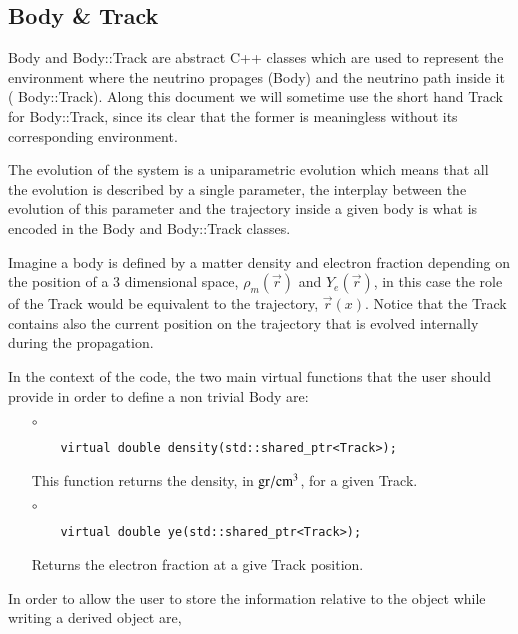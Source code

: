 \subsection{Body \& Track}

{\ttf Body} and {\ttf Body::Track} are abstract {\ttf C++} classes
which are used to represent the environment where the neutrino
propages ({\ttf Body}) and the neutrino path inside it ({\ttf
  Body::Track}). Along this document we will sometime use the short
hand {\ttf Track} for {\ttf Body::Track},
 since its clear that the former is meaningless without its
 corresponding environment.

The evolution of the system is a uniparametric evolution which means
that all the evolution is described by a single parameter, the
interplay between the evolution of this parameter and the trajectory
inside a given body is what is encoded in the {\ttf Body} and 
{\ttf Body::Track} classes.

Imagine a {\ttf body} is defined by a matter density and electron fraction depending on
the position of a 3 dimensional space, $\rho_m(\vec{r})$ and
$Y_e(\vec{r})$, in this case the role of the {\ttf Track} would be
equivalent to the trajectory, $\vec{r}(x)$.
Notice that the {\ttf Track} contains also the current position on
the trajectory that is evolved internally during the propagation.

In the context of the code, the two main virtual functions that the
user should provide in order to define a non trivial {\ttf Body} are:
\begin{itemize}
\item[$\circ$] 
  \begin{lstlisting}
    virtual double density(std::shared_ptr<Track>);
  \end{lstlisting}
This function returns the density, in ${\rm gr}/{\rm cm}^3$, for a
given {\ttf Track}.
\item[$\circ$] 
  \begin{lstlisting}
    virtual double ye(std::shared_ptr<Track>);
  \end{lstlisting}
Returns the electron fraction at a give {\ttf Track} position.
\end{itemize}

In order to allow the user to store the information relative to the
object while writing a derived object are,

